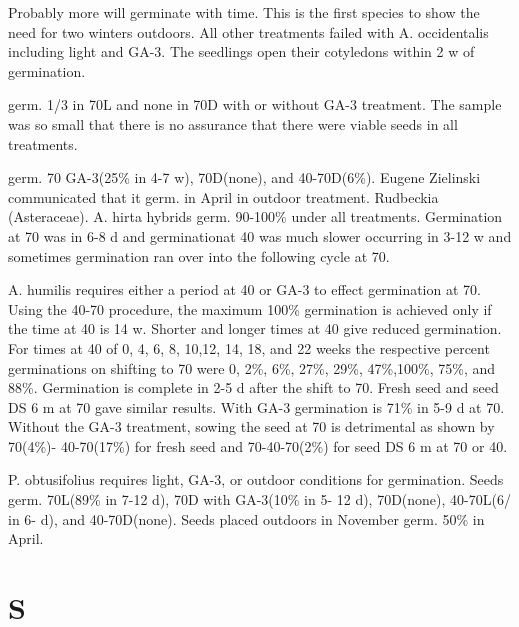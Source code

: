 \begin{description}
Probably more will germinate with time. This is the first species to show the need for
two winters outdoors. All other treatments failed with A. occidentalis including light
and GA-3. The seedlings open their cotyledons within 2 w of germination.
\item[R. odoratus] germ. 1/3 in 70L and none in 70D with or without GA-3 treatment.
The sample was so small that there is no assurance that there were viable seeds in all
treatments.

\item[R. parviflorus] germ. 70 GA-3(25\% in 4-7 w), 70D(none), and 40-70D(6\%).
Eugene Zielinski communicated that it germ. in April in outdoor treatment.
Rudbeckia (Asteraceae). A. hirta hybrids germ. 90-100\% under all
treatments. Germination at 70 was in 6-8 d and germinationat 40 was much slower
occurring in 3-12 w and sometimes germination ran over into the following cycle at 70.
\item[Ruellia (Acanthaceae)] A. humilis requires either a period at 40 or GA-3 to
effect germination at 70. Using the 40-70 procedure, the maximum 100\% germination
is achieved only if the time at 40 is 14 w. Shorter and longer times at 40 give reduced
germination. For times at 40 of 0, 4, 6, 8, 10,12, 14, 18, and 22 weeks the respective
percent germinations on shifting to 70 were 0, 2\%, 6\%, 27\%, 29\%, 47\%,100\%, 75\%,
and 88\%. Germination is complete in 2-5 d after the shift to 70. Fresh seed and seed
DS 6 m at 70 gave similar results. With GA-3 germination is 71\% in 5-9 d at 70.
Without the GA-3 treatment, sowing the seed at 70 is detrimental as shown by 70(4\%)-
40-70(17\%) for fresh seed and 70-40-70(2\%) for seed DS 6 m at 70 or 40.
\item[Rumex (Polygonaceae)] P. obtusifolius requires light, GA-3, or outdoor
conditions for germination. Seeds germ. 70L(89\% in 7-12 d), 70D with GA-3(10\% in 5-
12 d), 70D(none), 40-70L(6/ in 6- d), and 40-70D(none). Seeds placed outdoors in
November germ. 50\% in April.
\end{description}

\section{S}

